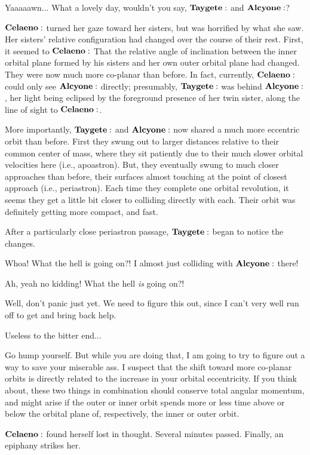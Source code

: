 \documentclass[main.tex]{subfiles}
\begin{document}
\Celaeno Yaaaaawn... What a lovely day, wouldn't you say, $\Taygete$ and $\Alcyone$?

$\Celaeno$ turned her gaze toward her sisters, but was horrified by what she saw.  Her sisters' relative configuration had changed over the course of their rest.  First, it seemed to $\Celaeno$ That the relative angle of inclination between the inner orbital plane formed by his sisters and her own outer orbital plane had changed.  They were now much more co-planar than before.  In fact, currently, $\Celaeno$ could only see $\Alcyone$ directly; presumably, $\Taygete$ was behind $\Alcyone$, her light being eclipsed by the foreground presence of her twin sister, along the line of sight to $\Celaeno$.

More importantly, $\Taygete$ and $\Alcyone$ now shared a much more eccentric orbit than before.  First they swung out to larger distances relative to their common center of mass, where they sit patiently due to their much slower orbital velocities here (i.e., apoastron).  But, they eventually swung to much closer approaches than before, their surfaces almost touching at the point of closest approach (i.e., periastron).  Each time they complete one orbital revolution, it seems they get a little bit closer to colliding directly with each.  Their orbit was definitely getting more compact, and fast.

After a particularly close periastron passage, $\Taygete$ began to notice the changes.

\Taygete  Whoa!  What the hell is going on?!  I almost just colliding with $\Alcyone$ there!

\Alcyone Ah, yeah no kidding!  What the hell \textit{is} going on?!

\Celaeno  Well, don't panic just yet.  We need to figure this out, since I can't very well run off to get and bring back help.

\Alcyone Useless to the bitter end...

\Celaeno Go hump yourself.  But while you are doing that, I am going to try to figure out a way to save your miserable ass.  I suspect that the shift toward more co-planar orbits is directly related to the increase in your orbital eccentricity.  If you think about, these two things in combination should conserve total angular momentum, and might arise if the outer or inner orbit spends more or less time above or below the orbital plane of, respectively, the inner or outer orbit.

$\Celaeno$ found herself lost in thought.  Several minutes passed.  Finally, an epiphany strikes her.
\end{document}
